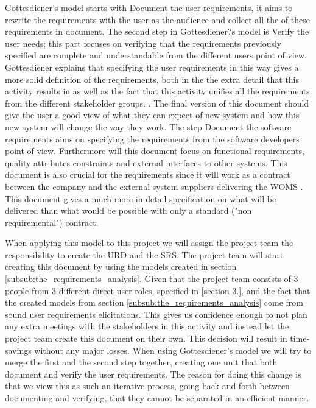 \documentclass[a4paper]{article}
\begin{document}
Gottesdiener's model starts with Document the user requirements, it aims to rewrite the requirements with the user as the audience and collect all the of these requirements in document. The second step in Gottesdiener?s model is Verify the user needs; this part focuses on verifying that the requirements previously specified are complete and understandable from the different users point of view. Gottesdiener explains that specifying the user requirements in this way gives a more solid definition of the requirements, both in the the extra detail that this activity results in as well as the fact that this activity unifies all the requirements from the different stakeholder groups. \cite{gott234}. The final version of this document should give the user a good view of what they can expect of new system and how this new system will change the way they work\cite{gott235}. The step Document the software requirements aims on specifying the requirements from the software developers point of view. Furthermore will this document focus on functional requirements, quality attributes constraints and external interfaces to other systems\cite{gott238}. This document is also crucial for the requirements since it will work as a contract between the company and the external system suppliers delivering the WOMS \cite{gott238}. This document gives a much more in detail specification on what will be delivered than what would be possible with only a standard ("non requiremental") contract. 

When applying this model to this project we will assign the project team the responsibility to create the URD and the SRS. The project team will start creating this document by using the models created in section \ref{subsub:the_requirements_analysis}.  Given that the project team consists of 3 people from 3 different direct user roles, specified in \ref{section 3.}, and the fact that the created models from section \ref{subsub:the_requirements_analysis} come from sound user requirements elicitations. This gives us confidence enough to not plan any extra meetings with the stakeholders in this activity and instead let the project team create this document on their own. This decision will result in time-savings without any major losses. When using Gottesdiener's model we will try to merge the first and the second step together, creating one unit that both document and verify the user requirements. The reason for doing this change is that we view this as such an iterative process, going back and forth between documenting and verifying, that they cannot be separated in an efficient manner.  
\end{document}

